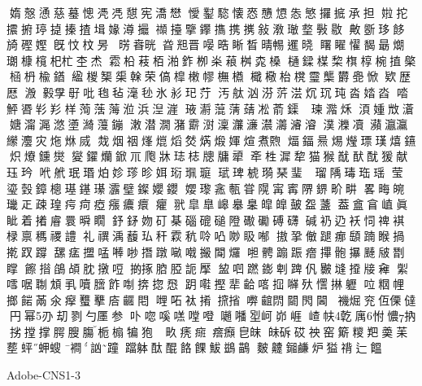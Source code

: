 媠慤慂慈𦻒憁凴𠙖憇宪𣾷𢡟
懓𨮝𩥝懐㤲𢦀𢣁怣慜攞掋𠄘担
𡝰拕𢸍捬𤧟㨗搸揸𡎎𡟼澊𢸶
𥜝擡擥鑻㩦携㩗敍漖𤨨𤨣斅敭
敟斵𤥀䬷旑䃘𡠩旣忟𣐀昘
𣇷𣇸晄𣆤𣆥晋𠹵晧𥇦晳晴𣈱𨗴𣇈
𥌓矅𢣷馤朂𤎜𤨡槺𣟂杞杧杢𤇍
𩃭柗䓩栢湐鈼栁𣏦𦶠桝𣑯槡
樋𨫟楳棃𣗍椁椀㨁𣘼㮀枬楡𨩊
䋼椶榘㮡𠏉荣傐槹𣙙𢄪橅𣜃
檝㯳枱櫈𩆜㰍欝𠤣惞欵歴𢟍
溵𣫛𡥘㝀吡𣭚毡𣻼毜氷𢒋𤣱𦭑
汚舦汹𣶼䓅𣶽𤆤𤤌𤤀𣳉㛥㳫
𠴲鮃𣇹𢒑羏样𦴥𦶡𦷫涖浜湼漄
𤥿𤂅𦹲蔳𦽴凇萮𨬡港𣸯瑓𣾂秌
湏媑𣁋濸㜍澝𣸰滺𡒗𤀽䕕鏰
潄潜㵎潴𩅰㴻澟𤅄濓𤂑𤅕𤀹𣿰
𣾴𤄿凟𤅖𤅗𤅀𦇝灋灾炧烌烕
烖烟䄄㷨熴熖𤉷焫煅媈煊煮𤍥
煏鍢𤋁焬𤑚𤨧𤨢熺𨯨炽爎鑂爕
夑鑃爤鍁𥘅爮牀𤥴梽牕牗㹕
𣁄栍漽犂猫𤠣𨠫䣭𨠄猨献珏玪
𠰺𦨮珉瑉𤇢𡛧𤨤昣㛅𤦷𤦍𤧻
珷琕椃𤨦琹㻗瑜𢢭瑠𨺲瑇珤瑶
莹瑬瑴鏱樬璂䥓𤪌𤅟𤩹𨮏孆𨰃
𡢞瓈𡦈甎甞𨻙𡩋寗𨺬鎅畍畊
畧畮𤾂㼄𤴓疎瑝疞疴瘂瘬癑癏
癯𦏵皐臯㟸𦤑𦤎皡皥皷盌𦾟
葢𥂝𥅽𡸜眞眦着撯𥈠睘𣊬瞯
𨥤𨥨𡛁矴棊碯磇磓隥礮𥗠磗礴
碱𧘌辸袄𢘜禆褀椂禀𥡗禝𧬹
礼禩渪𧄦㺨秆𩄍秔唥𠱂𠴕𥄫喐
𢳆㧬𠍁蹆𤶸𩓥𨂾睺𢰸㨴䟕𨅝
𦧲𤷪擝𠵼𠾴𠳕撍蹾𠺖𠽤𢲩𨉖𤓓
𠵆𩩍𨃩䟴𤺧𢳂骲㩧𩗴㿭㔆𥋇
𩟔𢵄鵮頕䏙撴哣𢯊㧻𦛚𦜖𧦠擪
𥁒𠱃蹨𨭌𠜱䠋𠆩㿺塳𢶍𤗈𠓼
𦂗𠽌啹䎺䪴𢩦𡂝膪飵𠶜捹㧾𢝵
跀嚡摼㹃𪘁𠸉𢫏𡃈𣧂㦒㨆𨊛
㕸𥹉𢃇𢲲𩜠㒼氽𤸻𧕴𢺋𢈈𪙛𨳍
𠹺𠰴𧘹𢯎𢱑㨘𡃇𪘲𨳒𨶙𨳊閪
𧝞煀兖仾傈㒓円幂刅刧剹勺㕓参
卟唿嗘㗝嘡噔𡁻𡃓𡋾㞹峁崕
嵖㠸亁庽㤔憹抐挘摚撑腭膄膓
栀㮼犏狍𤟯猹畂痜㿀𤺥㿗皀皌
𤽜䂨砹䄃窑簛糭羓羮苿塟蚲䖬螋
襇訩蹱𨆉躰酞醌餎餜鮁鷀鶓
麬䶑鎺鹻炉獈禙辷饂

Adobe-CNS1-3

